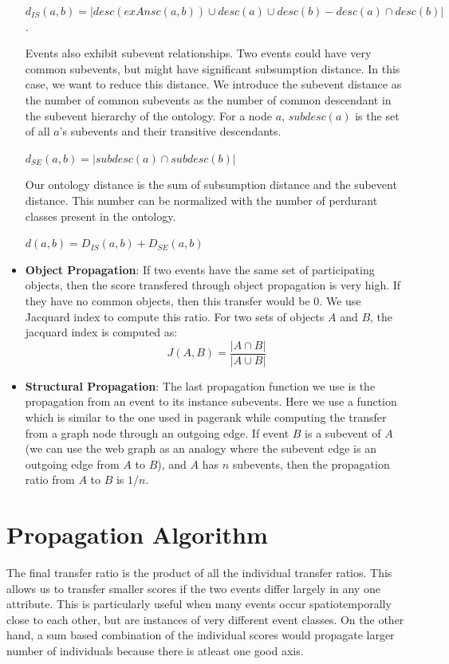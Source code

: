 \begin{itemize}
$d_{IS}(a, b) = |desc(exAnsc(a, b)) \cup desc(a) \cup desc(b) - desc(a) \cap desc(b)|$.

Events also exhibit subevent relationships. Two events could have very common subevents, but might have significant subsumption distance. In this case, we want to reduce this distance. We introduce the subevent distance as the number of common subevents as the number of common descendant in the subevent hierarchy of the ontology. For a node $a$, $subdesc(a)$ is the set of all $a$'s subevents and their transitive descendants.

$d_{SE}(a, b) = |subdesc(a) \cap subdesc(b)|$

Our ontology distance is the sum of subsumption distance and the subevent distance. This number can be normalized with the number of perdurant classes present in the ontology.

$d(a, b) = D_{IS}(a, b) + D_{SE}(a, b)$

\item \textbf{Object Propagation}: If two events have the same set of participating objects, then the score transfered through object propagation is very high. If they have no common objects, then this transfer would be 0. We use Jacquard index to compute this ratio. For two sets of objects $A$ and $B$, the jacquard index is computed as:
\begin{equation}
J(A, B) = \frac{|A \cap B|}{|A \cup B|} \nonumber
\end{equation}

\item \textbf{Structural Propagation}: The last propagation function we use is the propagation from an event to its instance subevents. Here we use a function which is similar to the one used in pagerank while computing the transfer from a graph node through an outgoing edge. If event $B$ is a subevent of $A$ (we can use the web graph as an analogy where the subevent edge is an outgoing edge from $A$ to $B$), and $A$ has $n$ subevents, then the propagation ratio from $A$ to $B$ is $1/n$.

\end{itemize}

\section {Propagation Algorithm}

The final transfer ratio is the product of all the individual transfer ratios. This allows us to transfer smaller scores if the two events differ largely in any one attribute. This is particularly useful when many events occur spatiotemporally close to each other, but are instances of very different event classes. On the other hand, a sum based combination of the individual scores would propagate larger number of individuals because there is atleast one good axis.

